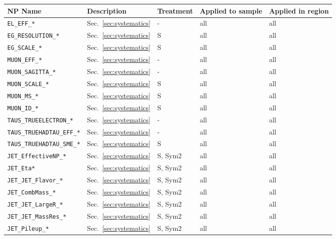 \begin{table}[ht]
    \centering
    \scriptsize
    \begin{tabular}{|p{3.5cm}|p{2.0cm}|p{1.5cm}|p{2cm}|p{1.5cm}|}
        \hline
        \hline
        NP Name & Description & Treatment & Applied to sample & Applied in region \\
        \hline
        \hline
        \hline
        \texttt{EL\_EFF\_*} & Sec.~\ref{sec:systematics} & - & all & all \\
        \texttt{EG\_RESOLUTION\_*} & Sec.~\ref{sec:systematics} & S & all & all \\
        \texttt{EG\_SCALE\_*} & Sec.~\ref{sec:systematics} & S & all & all \\
        \texttt{MUON\_EFF\_*} & Sec.~\ref{sec:systematics} & - & all & all \\
        \texttt{MUON\_SAGITTA\_*} & Sec.~\ref{sec:systematics} & - & all & all \\
        \texttt{MUON\_SCALE\_*} & Sec.~\ref{sec:systematics} & S & all & all \\
        \texttt{MUON\_MS\_*} & Sec.~\ref{sec:systematics} & S & all & all \\
        \texttt{MUON\_ID\_*} & Sec.~\ref{sec:systematics} & S & all & all \\
        \texttt{TAUS\_TRUEELECTRON\_*} & Sec.~\ref{sec:systematics} & - & all & all \\
        \texttt{TAUS\_TRUEHADTAU\_EFF\_*} & Sec.~\ref{sec:systematics} & - & all & all \\
        \texttt{TAUS\_TRUEHADTAU\_SME\_*} & Sec.~\ref{sec:systematics} & S & all & all \\
        \texttt{JET\_EffectiveNP\_*} & Sec.~\ref{sec:systematics} & S, Sym2 & all & all \\
        \texttt{JET\_Eta*} & Sec.~\ref{sec:systematics} & S, Sym2 & all & all \\
        \texttt{JET\_JET\_Flavor\_*} & Sec.~\ref{sec:systematics} & S, Sym2 & all & all \\
        \texttt{JET\_CombMass\_*} & Sec.~\ref{sec:systematics} & S, Sym2 & all & all \\
        \texttt{JET\_JET\_LargeR\_*} & Sec.~\ref{sec:systematics} & S, Sym2 & all & all \\
        \texttt{JET\_JET\_MassRes\_*} & Sec.~\ref{sec:systematics} & S, Sym2 & all & all \\
        \texttt{JET\_Pileup\_*} & Sec.~\ref{sec:systematics} & S, Sym2 & all & all \\

\end{tabular}
\end{table}
